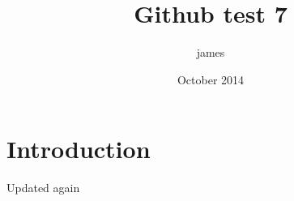 \documentclass{article}
\title{Github test 7}
\author{james }
\date{October 2014}
\begin{document}
\maketitle

\section{Introduction}

Updated again
\end{document}
